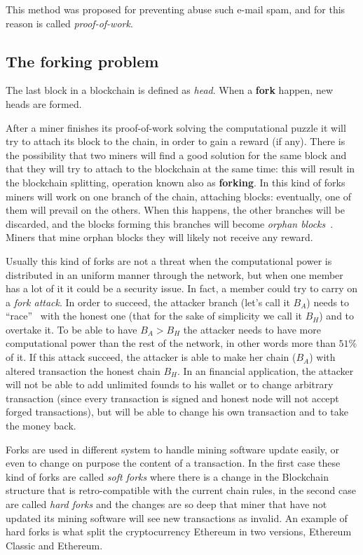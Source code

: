 This method was proposed for preventing abuse such e-mail spam, and for this
reason is called \textit{proof-of-work}\cite{back02}.

\subsection{The forking problem}

The last block in a blockchain is defined as \textit{head}. When a
\textbf{fork} happen, new heads are formed.

After a miner finishes its proof-of-work solving the computational puzzle
it will try to attach its block to the chain, in order to gain a reward (if
any). There is the possibility that two miners will find a good solution for
the same block and that they will try to attach to the blockchain at the same
time: this will result in the blockchain splitting, operation known also as
\textbf{forking}. In this kind of forks miners will work on one branch of the
chain, attaching blocks: eventually, one of them will prevail on the others.
When this happens, the other branches will be discarded, and the blocks
forming this branches will become \textit{orphan blocks}~\cite{decker13}.
Miners that mine orphan blocks they will likely not receive any reward.

Usually this kind of forks are not a threat when the computational power is
distributed in an uniform manner through the network, but when one member has a
lot of it it could be a security issue. In fact, a member could try to carry on
a \textit{fork attack}. In order to succeed, the attacker branch (let's call it
$B_A$) needs to ``race''~\cite{nakamoto08} with the honest one (that for the
sake of simplicity we call it $B_H$) and to overtake it. To be able to have
$B_A > B_H$ the attacker needs to have more computational power than the rest of
the network, in other words more than $51\%$ of it.
If this attack succeed, the attacker is able to make her chain ($B_A$) with
altered transaction the honest chain $B_H$.
In an financial application, the attacker will not be able to add unlimited
founds to his wallet or to change arbitrary transaction (since every
transaction is signed and honest node will not accept forged transactions), but
will be able to change his own transaction and to take the money back.

Forks are used in different system to handle mining software update easily, or
even to change on purpose the content of a transaction. In the first case these
kind of forks are called \textit{soft forks} where there is a change in the
Blockchain structure that is retro-compatible with the current chain rules, in
the second case are called \textit{hard forks} and the changes are so deep that
miner that have not updated its mining software will see new transactions
as invalid. An example of hard forks is what split the cryptocurrency Ethereum
in two versions, Ethereum Classic and Ethereum.
